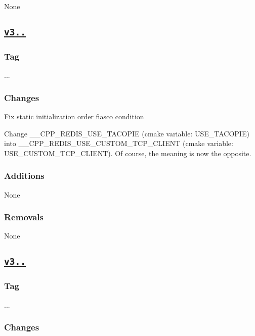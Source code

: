 None

\subsection*{\href{https://github.com/Cylix/cpp_redis/releases/tag/3.2.1}{\tt v3..}}

\subsubsection*{Tag}

{..}. \subsubsection*{Changes}


\begin{DoxyItemize}
\item Fix static initialization order fiasco condition
\item Change {\ttfamily \+\_\+\+\_\+\+C\+P\+P\+\_\+\+R\+E\+D\+I\+S\+\_\+\+U\+S\+E\+\_\+\+T\+A\+C\+O\+P\+IE} (cmake variable\+: {\ttfamily U\+S\+E\+\_\+\+T\+A\+C\+O\+P\+IE}) into {\ttfamily \+\_\+\+\_\+\+C\+P\+P\+\_\+\+R\+E\+D\+I\+S\+\_\+\+U\+S\+E\+\_\+\+C\+U\+S\+T\+O\+M\+\_\+\+T\+C\+P\+\_\+\+C\+L\+I\+E\+NT} (cmake variable\+: {\ttfamily U\+S\+E\+\_\+\+C\+U\+S\+T\+O\+M\+\_\+\+T\+C\+P\+\_\+\+C\+L\+I\+E\+NT}). Of course, the meaning is now the opposite. \subsubsection*{Additions}
\end{DoxyItemize}

None \subsubsection*{Removals}

None

\subsection*{\href{https://github.com/Cylix/cpp_redis/releases/tag/3.2.0}{\tt v3..}}

\subsubsection*{Tag}

{..}. \subsubsection*{Changes}


